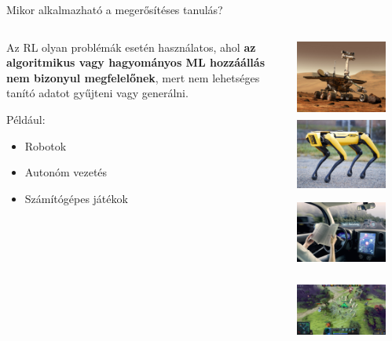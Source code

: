 \documentclass[english, aspectratio=169]{beamer}
\begin{document}
\begin{frame}{Mikor alkalmazható a megerősítéses tanulás?}
\begin{columns}
\begin{column}{.5\textwidth}
Az RL olyan problémák esetén használatos, ahol\textbf{ az algoritmikus vagy hagyományos ML hozzáállás nem bizonyul megfelelőnek}, mert nem lehetséges tanító adatot gyűjteni vagy generálni.\par\smallskip
Például:
\begin{itemize}
	\item Robotok
	\item Autonóm vezetés
	\item Számítógépes játékok
\end{itemize}
\end{column}
\begin{column}{.5\textwidth}
\begin{center}
\includegraphics[width=3cm, height=2.5cm]{images/reinforcement_2.png}
\includegraphics[width=3cm, height=2.5cm]{images/reinforcement_3.png}
\includegraphics[width=3cm, height=2.5cm]{images/reinforcement_4.png}
\includegraphics[width=3cm, height=2.5cm]{images/reinforcement_5.png}
\end{center}
\end{column}
\end{columns}
\end{frame}
\end{document}
